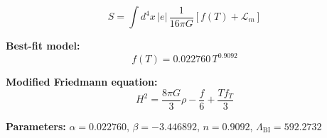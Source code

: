 
\begin{equation}
  S = \int d^4x \, |e| \, \frac{1}{16\pi G} \left[ f(T) + \mathcal{L}_m \right]
\end{equation}

\textbf{Best-fit model:}
\begin{equation}
  f(T) = 0.022760 \, T^{0.9092}
\end{equation}

\textbf{Modified Friedmann equation:}
\begin{equation}
  H^2 = \frac{8\pi G}{3} \rho - \frac{f}{6} + \frac{T f_T}{3}
\end{equation}

\textbf{Parameters:}
$\alpha = 0.022760$, \quad
$\beta = -3.446892$, \quad
$n = 0.9092$, \quad
$\Lambda_{\text{BI}} = 592.2732$